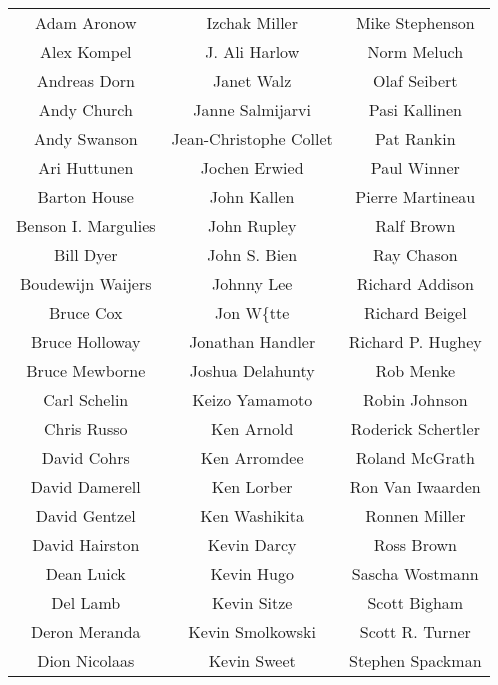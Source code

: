 \begin{center}
\begin{tabular}{ccc}
     Adam Aronow      &     Izchak Miller      &  Mike Stephenson  \\
     Alex Kompel      &     J. Ali Harlow      &    Norm Meluch    \\
    Andreas Dorn      &       Janet Walz       &    Olaf Seibert   \\
     Andy Church      &    Janne Salmijarvi    &   Pasi Kallinen   \\
    Andy Swanson      & Jean-Christophe Collet &     Pat Rankin    \\
    Ari Huttunen      &     Jochen Erwied      &    Paul Winner    \\
    Barton House      &      John Kallen       &  Pierre Martineau \\
 Benson I. Margulies  &      John Rupley       &     Ralf Brown    \\
      Bill Dyer       &      John S. Bien      &     Ray Chason    \\
  Boudewijn Waijers   &       Johnny Lee       &  Richard Addison  \\
      Bruce Cox       &       Jon W\{tte       &   Richard Beigel  \\
   Bruce Holloway     &    Jonathan Handler    & Richard P. Hughey \\
   Bruce Mewborne     &    Joshua Delahunty    &     Rob Menke     \\
    Carl Schelin      &     Keizo Yamamoto     &   Robin Johnson   \\
     Chris Russo      &       Ken Arnold       & Roderick Schertler\\
     David Cohrs      &      Ken Arromdee      &   Roland McGrath  \\
   David Damerell     &       Ken Lorber       &  Ron Van Iwaarden \\
    David Gentzel     &     Ken Washikita      &   Ronnen Miller   \\
   David Hairston     &      Kevin Darcy       &     Ross Brown    \\
     Dean Luick       &       Kevin Hugo       &  Sascha Wostmann  \\
      Del Lamb        &      Kevin Sitze       &    Scott Bigham   \\
    Deron Meranda     &    Kevin Smolkowski    &  Scott R. Turner  \\
    Dion Nicolaas     &      Kevin Sweet       &  Stephen Spackman \\

\end{tabular}
\end{center}
